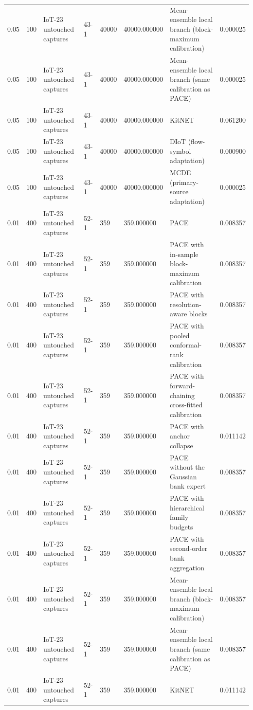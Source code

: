 \begin{tabular}{llllllll}
0.05 & 100 & IoT-23 untouched captures & 43-1 & 40000 & 40000.000000 & Mean-ensemble local branch (block-maximum calibration) & 0.000025 \\
0.05 & 100 & IoT-23 untouched captures & 43-1 & 40000 & 40000.000000 & Mean-ensemble local branch (same calibration as PACE) & 0.000025 \\
0.05 & 100 & IoT-23 untouched captures & 43-1 & 40000 & 40000.000000 & KitNET & 0.061200 \\
0.05 & 100 & IoT-23 untouched captures & 43-1 & 40000 & 40000.000000 & DIoT (flow-symbol adaptation) & 0.000900 \\
0.05 & 100 & IoT-23 untouched captures & 43-1 & 40000 & 40000.000000 & MCDE (primary-source adaptation) & 0.000025 \\
0.01 & 400 & IoT-23 untouched captures & 52-1 & 359 & 359.000000 & PACE & 0.008357 \\
0.01 & 400 & IoT-23 untouched captures & 52-1 & 359 & 359.000000 & PACE with in-sample block-maximum calibration & 0.008357 \\
0.01 & 400 & IoT-23 untouched captures & 52-1 & 359 & 359.000000 & PACE with resolution-aware blocks & 0.008357 \\
0.01 & 400 & IoT-23 untouched captures & 52-1 & 359 & 359.000000 & PACE with pooled conformal-rank calibration & 0.008357 \\
0.01 & 400 & IoT-23 untouched captures & 52-1 & 359 & 359.000000 & PACE with forward-chaining cross-fitted calibration & 0.008357 \\
0.01 & 400 & IoT-23 untouched captures & 52-1 & 359 & 359.000000 & PACE with anchor collapse & 0.011142 \\
0.01 & 400 & IoT-23 untouched captures & 52-1 & 359 & 359.000000 & PACE without the Gaussian bank expert & 0.008357 \\
0.01 & 400 & IoT-23 untouched captures & 52-1 & 359 & 359.000000 & PACE with hierarchical family budgets & 0.008357 \\
0.01 & 400 & IoT-23 untouched captures & 52-1 & 359 & 359.000000 & PACE with second-order bank aggregation & 0.008357 \\
0.01 & 400 & IoT-23 untouched captures & 52-1 & 359 & 359.000000 & Mean-ensemble local branch (block-maximum calibration) & 0.008357 \\
0.01 & 400 & IoT-23 untouched captures & 52-1 & 359 & 359.000000 & Mean-ensemble local branch (same calibration as PACE) & 0.008357 \\
0.01 & 400 & IoT-23 untouched captures & 52-1 & 359 & 359.000000 & KitNET & 0.011142 \\

\end{tabular}
